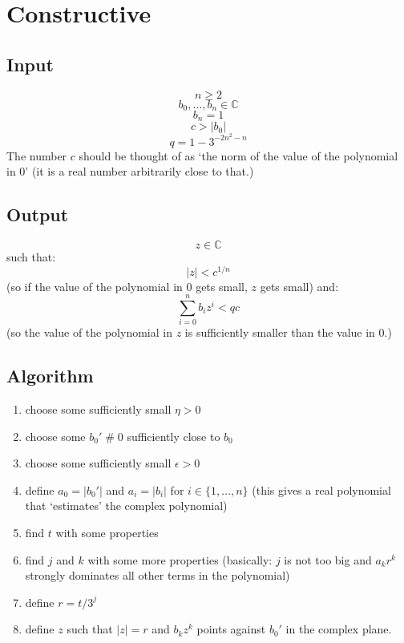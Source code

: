 \documentclass{article}
\def\CC{\mathbb{C}}
\begin{document}
\section{Constructive}

\subsection{Input}

$$n\ge 2$$
$$b_0,\ldots,b_n\in\CC$$
$$b_n = 1$$
$$c > |b_0|$$
$$q = 1 - 3^{-2n^2-n}$$
The number $c$ should be thought of as `the norm of the value of the polynomial in $0$'
(it is a real number arbitrarily close to that.)

\subsection{Output}

$$z\in\CC$$
such that:
$$|z| < c^{1/n}$$
(so if the value of the polynomial in 0 gets small, $z$ gets small) and:
$$\sum_{i=0}^n b_i z^i < qc$$
(so the value of the polynomial in $z$ is sufficiently smaller
than the value in $0$.)

\subsection{Algorithm}

\begin{enumerate}
\item choose some sufficiently small $\eta > 0$
\item choose some $b_0' \mathrel{\#} 0$ sufficiently close to $b_0$
\item choose some sufficiently small $\epsilon > 0$
\item define $a_0 = |b_0'|$ and $a_i = |b_i|$ for $i\in\{1,\ldots,n\}$
(this gives a real polynomial that `estimates' the complex polynomial)
\item find $t$ with some properties
\item find $j$ and $k$ with some more properties
(basically:
$j$ is not too big and $a_k r^k$ strongly dominates all other terms in the
polynomial)
\item define $r = t/3^j$
\item define $z$ such that $|z| = r$ and $b_k z^k$ points against $b_0'$
in the complex plane.
\end{enumerate}
\end{document}
